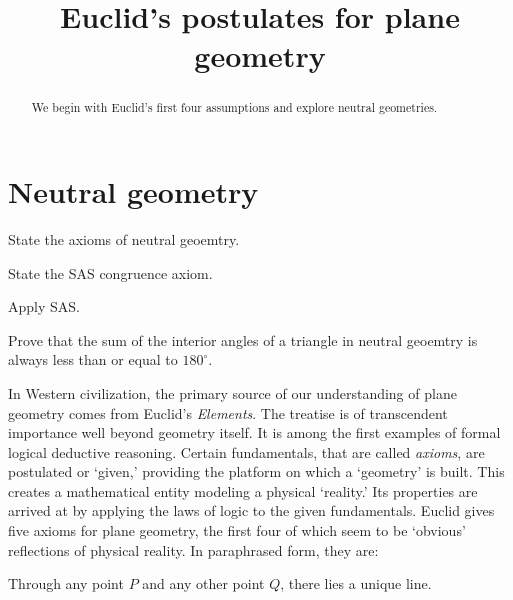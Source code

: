 \documentclass{ximera}
\title{Euclid's postulates for plane geometry} %
\begin{document}
\begin{abstract}
We begin with Euclid's first four assumptions and explore neutral
geometries.
\end{abstract}
\maketitle


\begin{center}
\end{center}



\section{Neutral geometry}

\begin{listOutcomes}
\item State the axioms of neutral geoemtry.
\item State the SAS congruence axiom.
\item Apply SAS.
\item Prove that the sum of the interior angles of a triangle in
  neutral geoemtry is always less than or equal to $180^\circ$.
\end{listOutcomes}



In Western civilization, the primary source of our understanding of
plane geometry comes from Euclid's \textit{Elements}. The treatise is
of transcendent importance well beyond geometry itself. It is among
the first examples of formal logical deductive reasoning. Certain
fundamentals, that are called \textit{axioms}, are postulated or
`given,' providing the platform on which a `geometry' is built. This
creates a mathematical entity modeling a physical `reality.' Its
properties are arrived at by applying the laws of logic to the given
fundamentals. Euclid gives five axioms for plane geometry, the first
four of which seem to be `obvious' reflections of physical reality. In
paraphrased form, they are:

\begin{axiom}[E1]
Through any point $P$ and any other point $Q$, there lies a unique
line.
\end{axiom}
\end{document}
